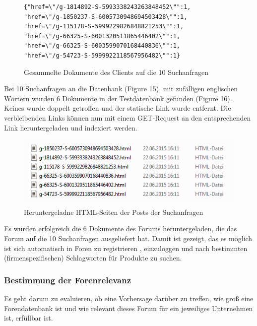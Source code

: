\begin{figure}[h!]
\begin{lstlisting}[language=HTML5]
{"href=\"/g-1814892-S-5993338243263848452\"":1,
"href=\"/g-1850237-S-6005730948694503428\"":1,
"href=\"/g-115178-S-5999229826848821253\"":1,
"href=\"/g-66325-S-6001320511865446402\"":1,
"href=\"/g-66325-S-6003599070168440836\"":1,
"href=\"/g-54723-S-5999922118567956482\"":1}
\end{lstlisting}
\caption{Gesammelte Dokumente des Clients auf die 10 Suchanfragen}
\end{figure}

Bei 10 Suchanfragen an die Datenbank (Figure 15), mit zufälligen englischen Wörtern wurden 6 Dokumente in der Testdatenbank gefunden (Figure 16). Keines wurde doppelt getroffen und der statische Link wurde entfernt. Die verbleibenden Links können nun mit einem GET-Request an den entsprechenden Link heruntergeladen und indexiert werden.
\newpage

\begin{figure}[h!]
\includegraphics{./images/postdownload.png}
\caption{Heruntergeladne HTML-Seiten der Posts der Suchanfragen}
\end{figure}


Es wurden erfolgreich die 6 Dokumente des Forums heruntergeladen, die das Forum auf die 10 Suchanfragen ausgeliefert hat.
Damit ist gezeigt, das es möglich ist sich automatisch in Foren zu registrieren , einzuloggen und nach bestimmten (firmenspezifischen) Schlagworten für Produkte zu suchen.

\subsubsection{Bestimmung der Forenrelevanz}

Es geht darum zu evaluieren, ob eine Vorhersage darüber zu treffen, wie groß eine Forendatenbank ist und wie relevant dieses Forum für ein jeweiliges Unternehmen ist, erfüllbar ist.


